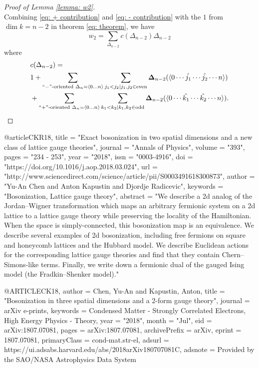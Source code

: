\documentclass[12pt]{article}
\begin{document}
\begin{proof}[Proof of Lemma \ref{lemma: w2}]
\begin{equation}
\label{eq: - contribution}
\end{equation}
Combining \eqref{eq: + contribution} and \eqref{eq: - contribution} with the $1$ from $\dim k = n-2$ in theorem \ref{eq: theorem}, we have
\begin{equation}
        w_2 = \sum_{\Delta_{n-2}} c(\Delta_{n-2}) \Delta_{n-2}
\end{equation}
where
\begin{equation}
    \begin{split}
        &c(\Delta_{n-2})= \\
        & 1 + \sum_{``-"\text{-oriented } \Delta_n = \langle 0 \dots n \rangle } \sum_{j_1 < j_2 | j_1, j_2 \in \text{even}} \boldsymbol \Delta_{n-2} ( \langle 0 \cdots \hat{j_1} \cdots \hat{j_2} \cdots n \rangle) \\
        &+ \sum_{``+"\text{-oriented } \Delta_n = \langle 0 \dots n \rangle } \sum_{k_1 < k_2 | k_1, k_2 \in \text{odd}} \boldsymbol \Delta_{n-2} ( \langle 0 \cdots \hat{k_1} \cdots \hat{k_2} \cdots n \rangle).
    \end{split}
\end{equation}



\end{proof}




@article{CKR18,
title = "Exact bosonization in two spatial dimensions and a new class of lattice gauge theories",
journal = "Annals of Physics",
volume = "393",
pages = "234 - 253",
year = "2018",
issn = "0003-4916",
doi = "https://doi.org/10.1016/j.aop.2018.03.024",
url = "http://www.sciencedirect.com/science/article/pii/S0003491618300873",
author = "Yu-An Chen and Anton Kapustin and Djordje Radicevic",
keywords = "Bosonization, Lattice gauge theory",
abstract = "We describe a 2d analog of the Jordan–Wigner transformation which maps an arbitrary fermionic system on a 2d lattice to a lattice gauge theory while preserving the locality of the Hamiltonian. When the space is simply-connected, this bosonization map is an equivalence. We describe several examples of 2d bosonization, including free fermions on square and honeycomb lattices and the Hubbard model. We describe Euclidean actions for the corresponding lattice gauge theories and find that they contain Chern–Simons-like terms. Finally, we write down a fermionic dual of the gauged Ising model (the Fradkin–Shenker model)."
}


@ARTICLE{CK18,
       author = {{Chen}, Yu-An and {Kapustin}, Anton},
        title = "{Bosonization in three spatial dimensions and a 2-form gauge theory}",
      journal = {arXiv e-prints},
     keywords = {Condensed Matter - Strongly Correlated Electrons, High Energy Physics - Theory},
         year = "2018",
        month = "Jul",
          eid = {arXiv:1807.07081},
        pages = {arXiv:1807.07081},
archivePrefix = {arXiv},
       eprint = {1807.07081},
 primaryClass = {cond-mat.str-el},
       adsurl = {https://ui.adsabs.harvard.edu/abs/2018arXiv180707081C},
      adsnote = {Provided by the SAO/NASA Astrophysics Data System}
}
\end{document}
